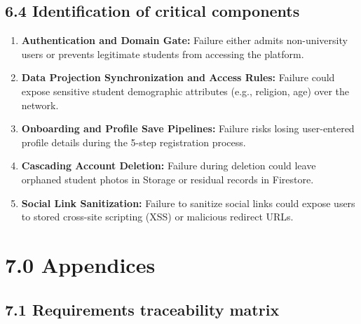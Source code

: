 \documentclass[11pt,letterpaper]{article}
\begin{document}
\subsection*{6.4 Identification of critical components}
\begin{enumerate}[leftmargin=*,noitemsep]
\item \textbf{Authentication and Domain Gate:} Failure either admits non-university users or prevents legitimate students from accessing the platform.
\item \textbf{Data Projection Synchronization and Access Rules:} Failure could expose sensitive student demographic attributes (e.g., religion, age) over the network.
\item \textbf{Onboarding and Profile Save Pipelines:} Failure risks losing user-entered profile details during the 5-step registration process.
\item \textbf{Cascading Account Deletion:} Failure during deletion could leave orphaned student photos in Storage or residual records in Firestore.
\item \textbf{Social Link Sanitization:} Failure to sanitize social links could expose users to stored cross-site scripting (XSS) or malicious redirect URLs.
\end{enumerate}

\newpage
\section*{7.0 Appendices}

\subsection*{7.1 Requirements traceability matrix}
\end{document}
